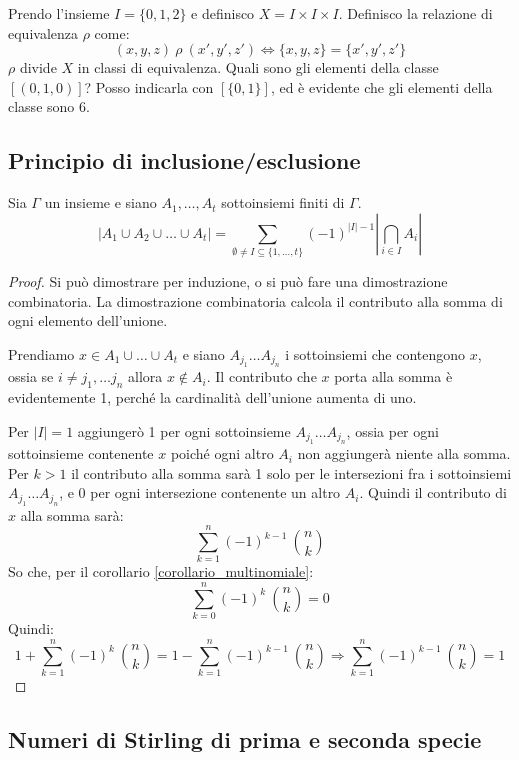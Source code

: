 Prendo l'insieme $I = \{ 0, 1, 2 \}$ e definisco $X = I \times I \times I$. Definisco la relazione di equivalenza $\rho$ come:
\[
(x, y, z) \ \rho \ (x', y', z') \Leftrightarrow \{ x, y, z \} = \{ x', y', z'\}
\]
$\rho$ divide $X$ in classi di equivalenza. Quali sono gli elementi della classe $[(0,1,0)]$? Posso indicarla con $[\{0,1\}]$, ed \`e evidente che gli elementi della classe sono 6.

\subsection{Principio di inclusione/esclusione}

\begin{prop}
Sia $\Gamma$ un insieme e siano $A_1, \dots, A_t$ sottoinsiemi finiti di $\Gamma$.
\begin{equation}
| A_1 \cup A_2 \cup \ldots \cup A_t |  = 
\sum_{\emptyset \neq I \subseteq \{ 1, \ldots, t \}} (-1)^{|I| - 1} \left| \bigcap_{i \in I} A_i \right|
\end{equation}
\end{prop}
\begin{proof}
Si pu\`o dimostrare per induzione, o si pu\`o fare una dimostrazione combinatoria. La dimostrazione combinatoria calcola il contributo alla somma di ogni elemento dell'unione.

Prendiamo $x \in A_1 \cup \dots \cup A_t$ e siano $A_{j_1} \dots A_{j_n}$ i sottoinsiemi che contengono $x$, ossia se $i \neq j_1 , \dots j_n$ allora $x \notin A_i$. Il contributo che $x$ porta alla somma \`e evidentemente 1, perch\'e la cardinalit\`a dell'unione aumenta di uno.

Per $|I| = 1$ aggiunger\`o 1 per ogni sottoinsieme $A_{j_1} \dots A_{j_n}$, ossia per ogni sottoinsieme contenente $x$ poich\'e ogni altro $A_i$ non aggiunger\`a niente alla somma. Per $k > 1$ il contributo alla somma sar\`a 1 solo per le intersezioni fra i sottoinsiemi $A_{j_1} \dots A_{j_n}$, e 0 per ogni intersezione contenente un altro $A_i$. Quindi il contributo di $x$ alla somma sar\`a:
\[
\sum_{k = 1}^{n} (-1)^{k - 1} \ \binom{n}{k}
\]
So che, per il corollario \ref{corollario_multinomiale}:
\[
\sum_{k = 0}^{n} (-1)^k \ \binom{n}{k} = 0
\]
Quindi:
\[
1 + \sum_{k = 1}^{n} (-1)^{k} \ \binom{n}{k} = 
1 - \sum_{k = 1}^{n} (-1)^{k - 1} \ \binom{n}{k} \Rightarrow
\sum_{k = 1}^{n} (-1)^{k - 1} \ \binom{n}{k} = 1
\]
\end{proof}

\subsection{Numeri di Stirling di prima e seconda specie}

